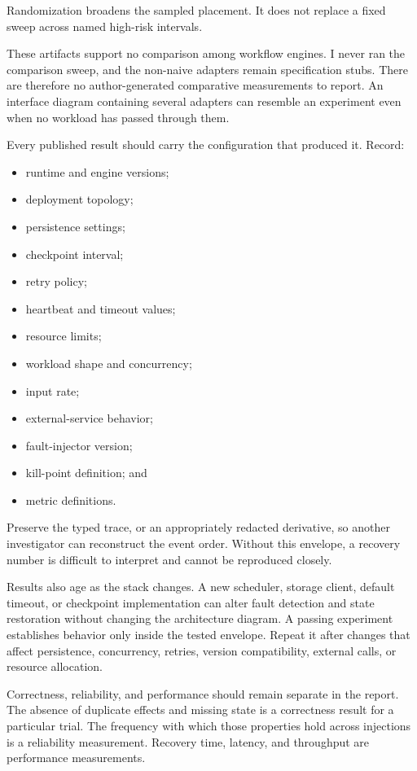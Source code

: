 Randomization broadens the sampled placement. It does not replace a fixed sweep across named high-risk intervals.

These artifacts support no comparison among workflow engines. I never ran the comparison sweep, and the non-naive adapters remain specification stubs. There are therefore no author-generated comparative measurements to report. An interface diagram containing several adapters can resemble an experiment even when no workload has passed through them.


Every published result should carry the configuration that produced it. Record:

\begin{itemize}
\tightlist
\item
  runtime and engine versions;
\item
  deployment topology;
\item
  persistence settings;
\item
  checkpoint interval;
\item
  retry policy;
\item
  heartbeat and timeout values;
\item
  resource limits;
\item
  workload shape and concurrency;
\item
  input rate;
\item
  external-service behavior;
\item
  fault-injector version;
\item
  kill-point definition; and
\item
  metric definitions.
\end{itemize}

Preserve the typed trace, or an appropriately redacted derivative, so another investigator can reconstruct the event order. Without this envelope, a recovery number is difficult to interpret and cannot be reproduced closely.

Results also age as the stack changes. A new scheduler, storage client, default timeout, or checkpoint implementation can alter fault detection and state restoration without changing the architecture diagram. A passing experiment establishes behavior only inside the tested envelope. Repeat it after changes that affect persistence, concurrency, retries, version compatibility, external calls, or resource allocation.

Correctness, reliability, and performance should remain separate in the report. The absence of duplicate effects and missing state is a correctness result for a particular trial. The frequency with which those properties hold across injections is a reliability measurement. Recovery time, latency, and throughput are performance measurements.

